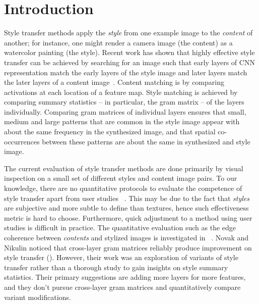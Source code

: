 \documentclass[runningheads]{llncs}
\begin{document}
\section{Introduction}
Style transfer methods apply the {\em style} from one example image to the {\em content} of another; 
for instance, one might render a camera image (the content) as a watercolor painting (the style). 
Recent work has shown that highly effective style transfer can be achieved by searching for an image such 
that early layers of CNN representation match the early layers of the style image and later layers match the later 
layers of a content image~\cite{gatys2016image}. Content matching is by comparing activations at each location of a 
feature map. Style matching is achieved by comparing summary statistics -- in particular, the gram matrix -- of the 
layers individually. Comparing gram matrices of individual layers ensures that small, medium and large patterns that 
are common in the style image appear with about the same frequency in the synthesized image, and that spatial co-occurrences 
between these patterns are about the same in synthesized and style image.

The current evaluation of style transfer methods are done primarily by visual inspection on a small set of different styles and content image pairs. To our knowledge, there are no quantitative protocols to evaluate the competence of 
style transfer apart from user studies ~\cite{li2018closed}. This may be due to the fact that {\em styles} are subjective and more subtle to define than textures, 
hence such effectiveness metric is hard to choose. Furthermore, quick adjustment to a method using user studies is difficult in practice.
 The quantitative evaluation such as the edge coherence between {\em contents} and stylized images is investigated in ~\cite{li2018closed}. Novak and Nikulin noticed that cross-layer 
 gram matrices reliably produce improvement on style transfer (\cite{novak2016improving}). However, 
 their work was an exploration of variants of style transfer rather than a thorough study to gain insights on 
 style summary statistics. Their primary suggestions are adding more layers for more features, and they don't pursue cross-layer gram matrices 
  and quantitatively compare variant modifications. 
  
\end{document}
